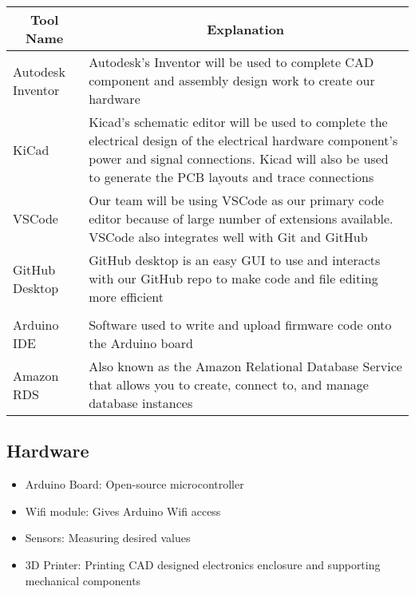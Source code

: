 \documentclass{article}
\begin{document}
\begin{table}[!hbt]
	\centering
	\begin{tabular}{|p{4cm}|p{8cm}|}
	\hline
	\multicolumn{1}{|c|}{\textbf{Tool Name}} & \multicolumn{1}{c|}{\textbf{Explanation}} 
	\\ \hline
	Autodesk Inventor
	&  Autodesk's Inventor will be used to complete CAD component and assembly design work to create our hardware  
	\newline                              
	\\ \hline
	KiCad
	& Kicad's schematic editor will be used to complete the electrical design of the electrical hardware component's power and signal connections. Kicad will also be used to generate the PCB layouts and trace connections
	\newline                              
	\\ \hline
	VSCode
	&  Our team will be using VSCode as our primary code editor because of large number of extensions available. VSCode also integrates well with Git and GitHub
	\newline                              
	\\ \hline
	GitHub Desktop
	&  GitHub desktop is an easy GUI to use and interacts with our GitHub repo to make code and file editing more efficient
	\newline                              
	\\ \hline
	\\ \hline
	Arduino IDE
	&  Software used to write and upload firmware code onto the Arduino board
	\newline                     
	\\ \hline
	Amazon RDS
	&  Also known as the Amazon Relational Database Service that allows you to create, connect to, and manage database instances
	\newline                     
	\\ \hline
	\end{tabular}
\end{table}

\subsection{Hardware}
\begin{itemize}
	\item Arduino Board: Open-source microcontroller 
	\item Wifi module: Gives Arduino Wifi access
	\item Sensors: Measuring desired values
	\item 3D Printer: Printing CAD designed electronics enclosure and supporting mechanical components
\end{itemize}
\end{document}
